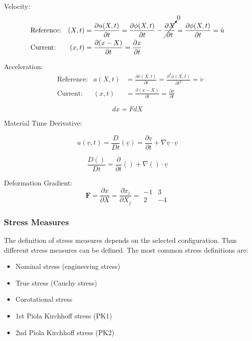 Velocity:
\begin{align}
&\textrm{Reference:}	&(X,t)&=\frac{\partial u(X,t)}{\partial t}=\frac{\partial \phi (X,t)}{\partial t} -  \cancelto{0}{\frac{\partial X}{\partial t}}=\frac{\partial\phi (X,t)}{\partial t}=\dot{u} \\
&\textrm{Current:}		&(x,t)&=\frac{\partial (x-X)}{\partial t}=\frac{\partial x}{\partial t}
\end{align}

Acceleration:
\begin{align}
&\textrm{Reference:}	&a(X,t)&=\frac{\partial v(X,t)}{\partial t}=\frac{\partial^2 \phi (X,t)}{\partial t^2} =\dot{v} \\
&\textrm{Current:}		&(x,t)&=\frac{\partial (x-X)}{\partial t}=\frac{\partial x}{\partial t}
\end{align}

\begin{equation}
dx=FdX
\end{equation}

Material Time Derivative:

\begin{equation}
a(\underline{v},t)=\frac{D}{Dt}(\underline{v})=\frac{\partial\underline{v}}{\partial t}+\nabla\underline{v}\cdot \underline{v}
\end{equation}

\begin{equation}
\frac{D()}{Dt}=\frac{\partial}{\partial t}()+\nabla ()\cdot \underline{v}
\end{equation}

Deformation Gradient:
\begin{equation}
\boldsymbol{F}=\frac{\partial x}{\partial X}=\frac{\partial x_i}{\partial X_j}=\begin{matrix}
 -1 & 3 \\
  2 & -4
\end{matrix}
\end{equation}

\subsubsection{Stress Measures}
The definition of stress measures depends on the selected configuration.
Thus different stress measures can be defined. The most common stress definitions are:
\begin{itemize}
\item Nominal stress (engineering stress)
\item True stress (Cauchy stress)
\item Corotational stress
\item 1st Piola Kirchhoff stress (PK1)
\item 2nd Piola Kirchhoff stress (PK2)
\end{itemize}


